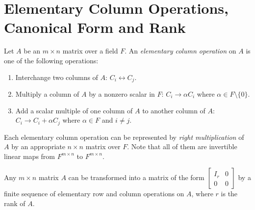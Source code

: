 \documentclass[
	11pt, %
	fleqn, %
	a4paper, %
]{LegrandOrangeBook}
\begin{document}
\section{Elementary Column Operations, Canonical Form and Rank}

\begin{definition}
    Let $A$ be an $m \times n$ matrix over a field $F$. An \emph{elementary column operation} on $A$ is one of the following operations:
    \begin{enumerate}
        \item Interchange two columns of $A$: $C_i \leftrightarrow C_j$.
        \item Multiply a column of $A$ by a nonzero scalar in $F$: $C_i \to \alpha C_i$ where $\alpha \in F \setminus \{0\}$.
        \item Add a scalar multiple of one column of $A$ to another column of $A$: $C_i \to C_i + \alpha C_j$ where $\alpha \in F$ and $i \neq j$.
    \end{enumerate}
    Each elementary column operation can be represented by \emph{right multiplication} of $A$ by an appropriate $n \times n$ matrix over $F$. Note that all of them are invertible linear maps from $F^{m \times n}$ to $F^{m \times n}$.
\end{definition}

\begin{proposition}
    Any $m \times n$ matrix $A$ can be transformed into a matrix of the form $\begin{bmatrix}
        I_r & 0 \\
        0 & 0
    \end{bmatrix}$ by a finite sequence of elementary row and column operations on $A$, where $r$ is the rank of $A$.
\end{proposition}

\begin{center}
\end{center}
\end{document}

